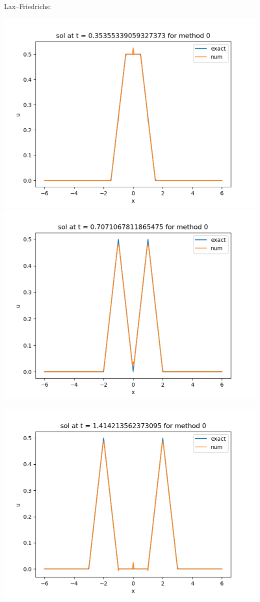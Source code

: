 \documentclass{article}
\begin{document}
\begin{enumerate}[label=(\alph*)]
Lax--Friedrichs:
\begin{center}
	\includegraphics[scale=.3]{hw11 sol n = 10 method 0}
	\includegraphics[scale=.3]{hw11 sol n = 20 method 0}
\end{center}
\begin{center}
	\includegraphics[scale=.3]{hw11 sol n = 40 method 0}

\end{center}
\end{enumerate}
\end{document}
